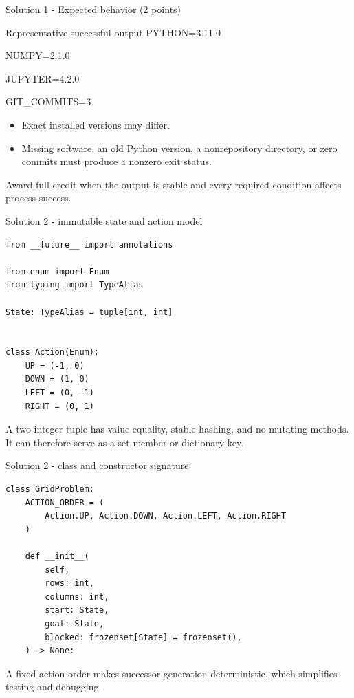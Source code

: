 \documentclass[aspectratio=169,11pt]{beamer}
\begin{document}
\begin{frame}{Solution 1 - Expected behavior (2 points)}
  \begin{block}{Representative successful output}
    \ttfamily
    PYTHON=3.11.0\par
    NUMPY=2.1.0\par
    JUPYTER=4.2.0\par
    GIT\_COMMITS=3
  \end{block}
  \begin{itemize}
    \item Exact installed versions may differ.
    \item Missing software, an old Python version, a nonrepository directory, or
      zero commits must produce a nonzero exit status.
  \end{itemize}
  \gradinglabel Award full credit when the output is stable and every required
  condition affects process success.
\end{frame}

\begin{frame}[fragile]{Solution 2 - immutable state and action model}
\begin{lstlisting}
from __future__ import annotations

from enum import Enum
from typing import TypeAlias

State: TypeAlias = tuple[int, int]


class Action(Enum):
    UP = (-1, 0)
    DOWN = (1, 0)
    LEFT = (0, -1)
    RIGHT = (0, 1)
\end{lstlisting}
  \answerlabel A two-integer tuple has value equality, stable hashing, and no
  mutating methods. It can therefore serve as a set member or dictionary key.
\end{frame}

\begin{frame}[fragile]{Solution 2 - class and constructor signature}
\begin{lstlisting}
class GridProblem:
    ACTION_ORDER = (
        Action.UP, Action.DOWN, Action.LEFT, Action.RIGHT
    )

    def __init__(
        self,
        rows: int,
        columns: int,
        start: State,
        goal: State,
        blocked: frozenset[State] = frozenset(),
    ) -> None:
\end{lstlisting}
\answerlabel A fixed action order makes successor generation deterministic,
which simplifies testing and debugging.
\end{frame}
\end{document}
